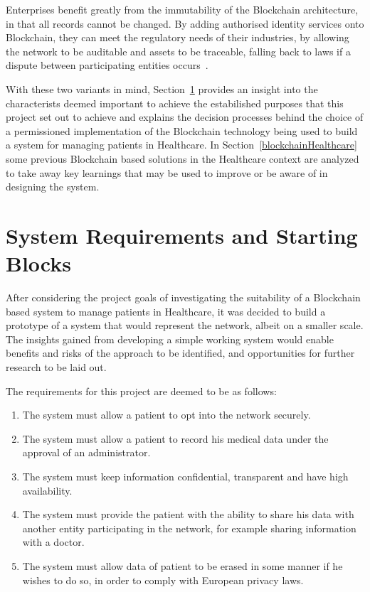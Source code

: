 Enterprises benefit greatly from the immutability of the Blockchain
architecture, in that all records cannot be changed. By adding authorised
identity services onto Blockchain, they can meet the regulatory needs of their
industries, by allowing the network to be auditable and assets to be traceable,
falling back to laws if a dispute between participating entities
occurs~\cite{Barclay2017}.

With these two variants in mind, Section~\ref{choosingHyperledger} provides an
insight into the characterists deemed important to achieve the estabilished
purposes that this project set out to achieve and explains the decision
processes behind the choice of a permissioned implementation of the Blockchain
technology being used to build a system for managing patients in Healthcare. In
Section~\ref{blockchainHealthcare} some previous Blockchain based solutions in
the Healthcare context are analyzed to take away key learnings that may be used
to improve or be aware of in designing the system.

\section{System Requirements and Starting Blocks}\label{choosingHyperledger}

After considering the project goals of investigating the suitability of a
Blockchain based system to manage patients in Healthcare, it was decided to
build a prototype of a system that would represent the network, albeit on a
smaller scale. The insights gained from developing a simple working system
would enable benefits and risks of the approach to be identified, and
opportunities for further research to be laid out.

The requirements for this project are deemed to be as follows:

\renewcommand{\labelenumi}{\Roman{enumi}.}
\begin{enumerate}
  \item The system must allow a patient to opt into the network securely.
  \item The system must allow a patient to record his medical data under the
    approval of an administrator.
  \item The system must keep information confidential, transparent and have
    high availability.
  \item The system must provide the patient with the ability to share his data
    with another entity participating in the network, for example sharing
    information with a doctor.
  \item The system must allow data  of patient to be erased in some manner if
    he wishes to do so, in order to comply with European privacy laws.
\end{enumerate}

